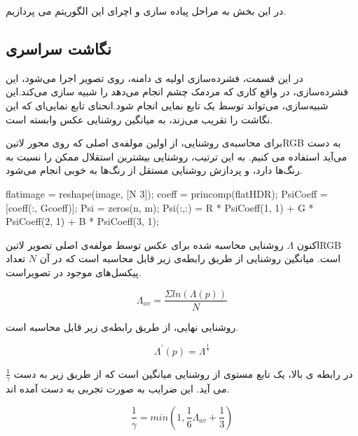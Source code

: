 در این بخش به مراحل پیاده سازی و اچرای این الگوریتم می پردازیم.

\subsection{نگاشت سراسری}
در این قسمت، فشرده‌سازی اولیه ی دامنه، روی تصویر اجرا می‌شود، این فشرده‌سازی، در واقع کاری که مردمک چشم انجام می‌دهد را شبیه سازی می‌کند.این شبیه‌سازی، می‌تواند توسط یک تابع نمایی انجام شود.انحنا‌ی تابع نمایی‌ای که این نگاشت را تقریب می‌زند، به میانگین روشنایی عکس وابسته است.

برای محاسبه‌ی روشنایی، از اولین مولفه‌ی اصلی که روی محور 
‌لاتین{RGB }
 به دست می‌آید استفاده می کنیم. به این ترتیب، روشنایی بیشترین استقلال ممکن را نسبت به رنگ‌ها دارد، و پردازش روشنایی مستقل از رنگ‌ها به خوبی انجام می‌شود.
 
 \begin{code}
 \begin{matlab}
 	 flatimage = reshape(image, [N 3]);
 	 coeff = princomp(flatHDR);
 	 PsiCoeff = [coeff(:, Gcoeff)];
 	 Psi = zeros(n, m);
 	 Psi(:,:) = R * PsiCoeff(1, 1) + G * PsiCoeff(2, 1) + B * PsiCoeff(3, 1);
 \end{matlab}
 \end{code}


اکنون $\Lambda$ روشنایی محاسبه شده برای عکس توسط مولفه‌ی اصلی تصویر
‌لاتین{RGB }
است. میانگین روشنایی از طریق رابطه‌ی زیر قابل محاسبه است که در آن $N$ تعداد پیکسل‌های موجود در تصویراست.

\begin{equation}
	\Lambda_{av} = \frac{\varSigma ln(\Lambda(p))}{N}
\end{equation}

روشنایی نهایی، از طریق رابطه‌ی زیر قابل محاسبه است.

\begin{equation}
	\Lambda^{'}(p) = \Lambda^{\frac{1}{\gamma}}	
\end{equation}

$\frac{1}{\gamma}$
در رابطه ی بالا،  یک تابع مستوی از  روشنایی میانگین است که از طریق زیر به دست می آید. این ضرایب به صورت تجربی به دست آمده اند.

\begin{equation}
	\frac{1}{\gamma} = min(1, \frac{1}{6} \Lambda_{av} + \frac{1}{3})
\end{equation}

